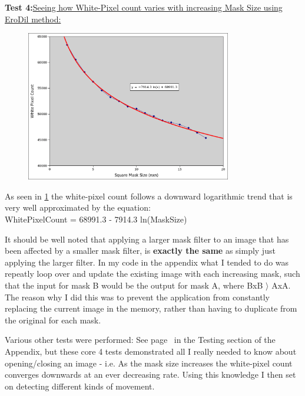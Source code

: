 {{\pagebreak
{\hspace{-20pt} \bf Test 4:}{\underline {Seeing how White-Pixel count varies with increasing Mask Size using EroDil method:}}
\begin{figure}[H]
	\vspace{0pt}
	\begin{center}
		\includegraphics[width=0.8\textwidth]{../images/ImageOps/chartMask}
		\caption{}
		\label{img:maskChart}
	\end{center}
\end{figure}
As seen in \cref{img:maskChart} the white-pixel count follows a downward logarithmic trend that is very well approximated by the equation:\\
WhitePixelCount = 68991.3 - 7914.3 ln(MaskSize)

It should be well noted that applying a larger mask filter to an image that has been affected by a smaller mask filter, is {\bf exactly the same} as simply just applying the larger filter.  In my code in the appendix what I tended to do was repeatly loop over and update the existing image with each increasing mask, such that the input for mask B would be the output for mask A, where BxB \(\rangle\) AxA.  The reason why I did this was to prevent the application from constantly replacing the current image in the memory, rather than having to duplicate from the original for each mask.

Various other tests were performed: See page~\pageref{append:tests} in the Testing section of the Appendix, but these core 4 tests demonstrated all I really needed to know about opening/closing an image - i.e. As the mask size increases the white-pixel count converges downwards at an ever decreasing rate. Using this knowledge I then set on detecting different kinds of movement.

}}

